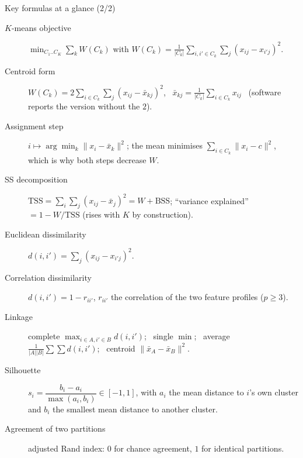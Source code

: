 \documentclass[aspectratio=169,11pt]{beamer}
\begin{document}
\begin{frame}{Key formulas at a glance (2/2)}
  \footnotesize
  \begin{description}
    \item[$K$-means objective] $\min_{C_1..C_K}\sum_{k}W(C_k)$ with
          $W(C_k)=\frac{1}{|C_k|}\sum_{i,i'\in C_k}\sum_j (x_{ij}-x_{i'j})^2$.
    \item[Centroid form] $W(C_k)=2\sum_{i\in C_k}\sum_j (x_{ij}-\bar x_{kj})^2$, \
          $\bar x_{kj}=\frac{1}{|C_k|}\sum_{i\in C_k}x_{ij}$ \ (software reports the
          version without the $2$).
    \item[Assignment step] $i \mapsto \arg\min_k \|x_i-\bar x_k\|^2$; the mean minimises
          $\sum_{i\in C_k}\|x_i-c\|^2$, which is why both steps decrease $W$.
    \item[SS decomposition] $\mathrm{TSS}=\sum_i\sum_j(x_{ij}-\bar x_j)^2 = W + \mathrm{BSS}$;
          ``variance explained'' $=1-W/\mathrm{TSS}$ (rises with $K$ by construction).
    \item[Euclidean dissimilarity] $d(i,i')=\sum_{j}(x_{ij}-x_{i'j})^2$.
    \item[Correlation dissimilarity] $d(i,i')=1-r_{ii'}$, $r_{ii'}$ the correlation of the
          two feature profiles ($p\ge3$).
    \item[Linkage] complete $\max_{i\in A,i'\in B}d(i,i')$; \ single $\min$; \
          average $\frac{1}{|A||B|}\sum\sum d(i,i')$; \ centroid $\|\bar x_A-\bar x_B\|^2$.
    \item[Silhouette] $s_i=\dfrac{b_i-a_i}{\max(a_i,b_i)}\in[-1,1]$, with $a_i$ the mean
          distance to $i$'s own cluster and $b_i$ the smallest mean distance to another
          cluster.
    \item[Agreement of two partitions] adjusted Rand index: $0$ for chance agreement, $1$
          for identical partitions.
  \end{description}
\end{frame}
\end{document}
